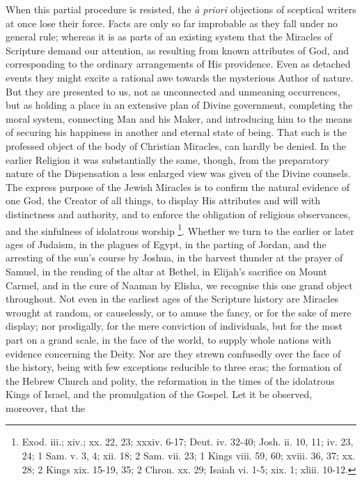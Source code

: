 When this partial procedure is resisted, the \emph{à
priori} objections of sceptical writers at once lose their force.
Facts are only so far improbable as they fall under no general rule;
whereas it is as parts of an existing system that the Miracles of
Scripture demand our attention, as resulting from known attributes of
God, and corresponding to the ordinary arrangements of His providence.
Even as detached events they might excite a rational awe towards the
mysterious Author of nature. But they are presented to us, not as
unconnected and unmeaning occurrences, but as holding a place in an
extensive plan of Divine government, completing the moral system,
connecting Man and his Maker, and introducing him to the means of
securing his happiness in another and eternal state of being. That
such is the professed object of the body of Christian Miracles, can
hardly be denied. In the earlier Religion it was substantially the
same, though, from the preparatory nature of the Dispensation a less enlarged view was given of the Divine counsels. The express
purpose of the Jewish Miracles is to confirm the natural evidence of
one God, the Creator of all things, to display His attributes and will
with distinctness and authority, and to enforce the obligation of
religious observances, and the sinfulness of idolatrous worship \footnote{Exod. iii.; xiv.; xx. 22, 23; xxxiv. 6-17;
Deut. iv. 32-40; Josh. ii. 10, 11; iv. 23, 24; 1 Sam. v. 3, 4; xii.
18; 2 Sam. vii. 23; 1 Kings viii. 59, 60; xviii. 36, 37; xx. 28; 2
Kings xix. 15-19, 35; 2 Chron. xx. 29; Isaiah vi. 1-5; xix. 1; xliii.
10-12.}. Whether we turn to the earlier or later ages of Judaism, in the
plagues of Egypt, in the parting of Jordan, and the arresting of the
sun's course by Joshua, in the harvest thunder at the prayer of
Samuel, in the rending of the altar at Bethel, in Elijah's sacrifice
on Mount Carmel, and in the cure of Naaman by Elisha, we recognise
this one grand object throughout. Not even in the earliest ages of the
Scripture history are Miracles wrought at random, or causelessly, or
to amuse the fancy, or for the sake of mere display; nor prodigally,
for the mere conviction of individuals, but for the most part on a
grand scale, in the face of the world, to supply whole nations with
evidence concerning the Deity. Nor are they strewn confusedly over the
face of the history, being with few exceptions reducible to three
eras; the formation of the Hebrew Church and polity, the reformation
in the times of the idolatrous Kings of Israel, and the promulgation of the Gospel. Let it be observed, moreover, that the
